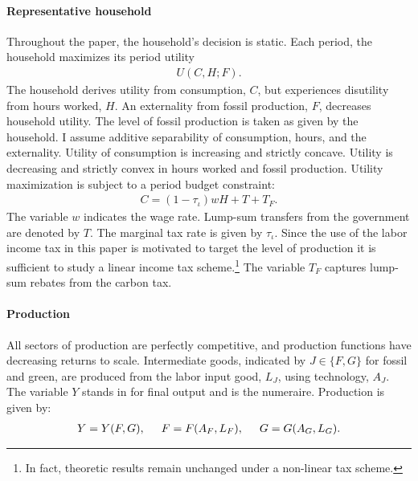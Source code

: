 \paragraph{Representative household}
Throughout the paper, the household's decision is static. Each period, the household maximizes its period utility
\begin{align*}
	U(C,H; F).
\end{align*} 
The household derives utility from consumption, $C$, but experiences disutility from hours worked, $H$. An externality from fossil production, $F$, decreases household utility. The level of fossil production is taken as given by the household.
I assume additive separability of consumption, hours, and the externality. Utility of consumption is increasing and strictly concave. Utility is decreasing and strictly convex in hours worked and fossil production.
Utility maximization is subject to a period budget constraint:
\begin{align}
	C= (1-\tau_{\iota})wH+T+T_F. \label{eq:hhbudget}
\end{align}
The variable $w$ indicates the wage rate.  Lump-sum transfers from the government are denoted by $T$. The marginal tax rate is given by $\tau_{\iota}$. Since the use of the labor income tax in this paper is motivated to target the level of production it is sufficient to study a linear income tax scheme.\footnote{ In fact, theoretic results remain unchanged under a non-linear tax scheme.}
The variable $T_F$ captures lump-sum rebates from the carbon tax.

\paragraph{Production}
All sectors of production are perfectly competitive, and production functions have decreasing returns to scale. %
Intermediate goods, indicated by $J\in \{F,G\}$ for fossil and green, are produced from the labor input good, $L_J$, using technology, $A_J$. The variable $Y$ stands in for final output and is the numeraire. Production is given by:
\begin{align}
	Y=Y(F, G), \hspace{5mm} F=F(A_F, L_F),\hspace{5mm} G=G(A_G, L_G). \label{eq:prod}
\end{align}

